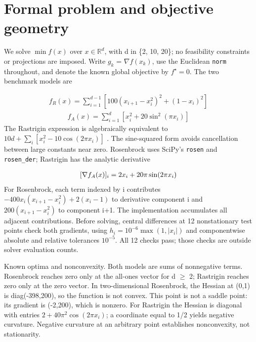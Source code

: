 \documentclass[10pt]{article}
\begin{document}
\newpage
\setcounter{section}{2}
\section{Formal problem and objective geometry}
We solve \(\min f(x)\) over \(x\in\mathbb{R}^d\), with d in \{2, 10, 20\}; no feasibility constraints or projections are imposed. Write \(g_k\) = \(\nabla f(x_k)\), use the Euclidean \texttt{norm} throughout, and denote the known global objective by \(f^\star=0\). The two benchmark models are

\setcounter{equation}{0}
\begin{equation}
\begin{aligned}
f_R(x)=\sum_{i=1}^{d-1}\left[100(x_{i+1}-x_i^2)^2+(1-x_i)^2\right]
\end{aligned}
\label{eq:models_R}
\end{equation}
\setcounter{equation}{1}
\begin{equation}
\begin{aligned}
f_A(x)=\sum_{i=1}^{d}\left[x_i^2+20\sin^2(\pi x_i)\right]
\end{aligned}
\label{eq:models_A}
\end{equation}
The Rastrigin expression is algebraically equivalent to \(10d+\sum_i[x_i^2-10\cos(2\pi x_i)]\) \cite{ref8}. The sine-squared form avoids cancellation between large constants near zero. Rosenbrock uses SciPy's \texttt{rosen} and \texttt{rosen\_der}; Rastrigin has the analytic derivative

\setcounter{equation}{2}
\begin{equation}
\begin{aligned}
\relax [\nabla f_A(x)]_i=2x_i+20\pi\sin(2\pi x_i)
\end{aligned}
\label{eq:gradients_A}
\end{equation}
For Rosenbrock, each term indexed by i contributes \(-400x_i(x_{i+1}-x_i^2)+2(x_i-1)\) to derivative component i and \(200(x_{i+1}-x_i^2)\) to component i+1. The implementation accumulates all adjacent contributions. Before solving, central differences at 12 nonstationary test points check both gradients, using \(h_i=10^{-6}\max(1,|x_i|)\) and componentwise absolute and relative tolerances \(10^{-5}\). All 12 checks pass; those checks are outside solver evaluation counts.

Known optima and nonconvexity. Both models are sums of nonnegative terms. Rosenbrock reaches zero only at the all-ones vector for d \(\geq\) 2; Rastrigin reaches zero only at the zero vector. In two-dimensional Rosenbrock, the Hessian at (0,1) is diag(-398,200), so the function is not convex. This point is not a saddle point: its gradient is (-2,200), which is nonzero. For Rastrigin the Hessian is diagonal with entries \(2+40\pi^2\cos(2\pi x_i)\); a coordinate equal to 1/2 yields negative curvature. Negative curvature at an arbitrary point establishes nonconvexity, not stationarity.
\end{document}
